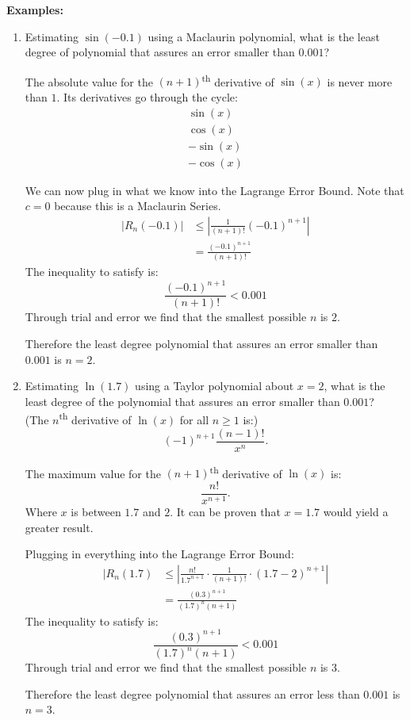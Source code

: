 \documentclass[12pt]{article}
\begin{document}
\noindent \textbf{Examples:}
\begin{enumerate}
    \item Estimating $\sin(-0.1)$ using a Maclaurin polynomial, what is the least degree of polynomial that assures an error smaller than $0.001$?

          The absolute value for the $(n+1)$\textsuperscript{th} derivative of $\sin(x)$ is never more than $1$. Its derivatives go through the cycle:
          \begin{gather*}
              \sin(x) \\
              \cos(x) \\
              -\sin(x) \\
              -\cos(x)
          \end{gather*}

          We can now plug in what we know into the Lagrange Error Bound. Note that $c=0$ because this is a Maclaurin Series.
          \begin{align*}
              |R_n(-0.1)| & \le \left| \frac{1}{(n+1)!} (-0.1)^{n+1} \right| \\
                          & = \frac{(-0.1)^{n+1}}{(n+1)!}
          \end{align*}
          The inequality to satisfy is:
          \[ \frac{(-0.1)^{n+1}}{(n+1)!} < 0.001 \]
          Through trial and error we find that the smallest possible $n$ is $2$.

          Therefore the least degree polynomial that assures an error smaller than $0.001$ is $n=2$.
          \bigskip

    \item Estimating $\ln(1.7)$ using a Taylor polynomial about $x=2$, what is the least degree of the polynomial that assures an error smaller than $0.001$?
          \\ (The $n$\textsuperscript{th} derivative of $\ln(x)$ for all $n \ge 1$ is:)
          \[ (-1)^{n+1} \frac{(n-1)!}{x^n}. \]

          The maximum value for the $(n+1)$\textsuperscript{th} derivative of $\ln(x)$ is:
          \[ \frac{n!}{x^{n+1}}. \]
          Where $x$ is between $1.7$ and $2$. It can be proven that $x=1.7$ would yield a greater result.

          Plugging in everything into the Lagrange Error Bound:
          \begin{align*}
              |R_n(1.7) & \le \left| \frac{n!}{1.7^{n+1}} \cdot \frac{1}{(n+1)!} \cdot (1.7-2)^{n+1} \right| \\[6pt]
                        & = \frac{(0.3)^{n+1}}{(1.7)^n (n+1)}
          \end{align*}
          The inequality to satisfy is:
          \[ \frac{(0.3)^{n+1}}{(1.7)^n (n+1)} < 0.001 \]
          Through trial and error we find that the smallest possible $n$ is $3$.

          Therefore the least degree polynomial that assures an error less than $0.001$ is $n=3$.
\end{enumerate}
\end{document}
